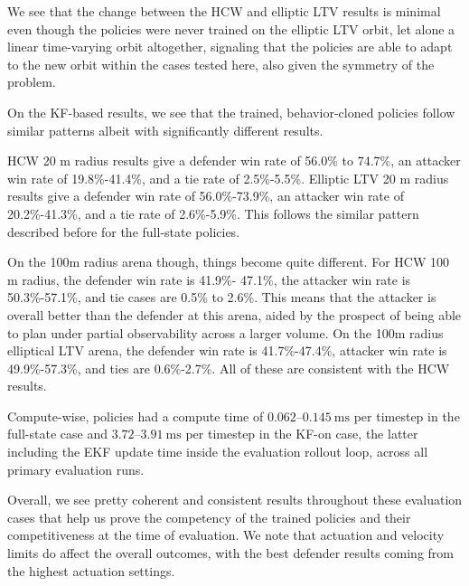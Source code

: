 We see that the change between the HCW and elliptic LTV results is minimal even though the policies were never trained on the elliptic LTV orbit, let alone a linear time-varying orbit altogether, signaling that the policies are able to adapt to the new orbit within the cases tested here, also given the symmetry of the problem.

On the KF-based results, we see that the trained, behavior-cloned policies follow similar patterns albeit with significantly different results.

HCW 20 m radius results give a defender win rate of 56.0\% to 74.7\%, an attacker win rate of 19.8\%-41.4\%, and a tie rate of 2.5\%-5.5\%. Elliptic LTV 20 m radius results give a defender win rate of 56.0\%-73.9\%, an attacker win rate of 20.2\%-41.3\%, and a tie rate of 2.6\%-5.9\%. This follows the similar pattern described before for the full-state policies.

On the 100m radius arena though, things become quite different. For HCW 100 m radius, the defender win rate is 41.9\%- 47.1\%, the attacker win rate is  50.3\%-57.1\%, and tie cases are 0.5\% to 2.6\%. This means that the attacker is overall better than the defender at this arena, aided by the prospect of being able to plan under partial observability across a larger volume. On the 100m radius elliptical LTV arena, the defender win rate is 41.7\%-47.4\%, attacker win rate is 49.9\%-57.3\%, and ties are 0.6\%-2.7\%. All of these are consistent with the HCW results.

Compute-wise, policies had a compute time of $0.062$--$0.145~\mathrm{ms}$ per timestep
in the full-state case and $3.72$--$3.91~\mathrm{ms}$ per timestep in the KF-on case, the latter including the EKF update time inside the evaluation rollout loop,
across all primary evaluation runs.

Overall, we see pretty coherent and consistent results throughout these evaluation cases that help us prove the competency of the trained policies and their competitiveness at the time of evaluation. We note that actuation and velocity limits do affect the overall outcomes, with the best defender results coming from the highest actuation settings.

